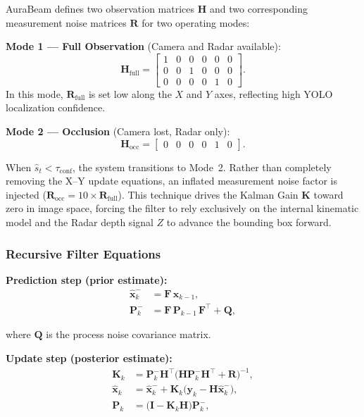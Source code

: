 \documentclass{jstarticle}
\theoremstyle{remark}
\begin{document}
AuraBeam defines two observation matrices $\mathbf{H}$ and two
corresponding measurement noise matrices $\mathbf{R}$ for two
operating modes:

\noindent\textbf{Mode 1 --- Full Observation} (Camera and Radar
available):
\begin{equation}
\mathbf{H}_{\mathrm{full}} =
\begin{bmatrix}
1 & 0 & 0 & 0 & 0 & 0 \\
0 & 0 & 1 & 0 & 0 & 0 \\
0 & 0 & 0 & 0 & 1 & 0
\end{bmatrix}.
\label{eq:H_full}
\end{equation}
In this mode, $\mathbf{R}_{\mathrm{full}}$ is set low along the $X$
and $Y$ axes, reflecting high YOLO localization confidence.

\noindent\textbf{Mode 2 --- Occlusion} (Camera lost, Radar only):
\begin{equation}
\mathbf{H}_{\mathrm{occ}} =
\begin{bmatrix}
0 & 0 & 0 & 0 & 1 & 0
\end{bmatrix}.
\label{eq:H_occ}
\end{equation}

When $\hat{s}_t < \tau_{\mathrm{conf}}$, the system transitions to
Mode~2. Rather than completely removing the X--Y update equations,
an inflated measurement noise factor is injected
($\mathbf{R}_{\mathrm{occ}} = 10 \times \mathbf{R}_{\mathrm{full}}$).
This technique drives the Kalman Gain $\mathbf{K}$ toward zero in
image space, forcing the filter to rely exclusively on the internal
kinematic model and the Radar depth signal $Z$ to advance the
bounding box forward.

\subsubsection{Recursive Filter Equations}

\noindent\textbf{Prediction step (prior estimate):}
\begin{align}
\hat{\mathbf{x}}^{-}_{k} &= \mathbf{F}\,\hat{\mathbf{x}}_{k-1},
\label{eq:kf_pred_x} \\
\mathbf{P}^{-}_{k} &= \mathbf{F}\,\mathbf{P}_{k-1}\,\mathbf{F}^{\top}
                    + \mathbf{Q},
\label{eq:kf_pred_p}
\end{align}

\noindent where $\mathbf{Q}$ is the process noise covariance matrix.

\noindent\textbf{Update step (posterior estimate):}
\begin{align}
\mathbf{K}_k &= \mathbf{P}^{-}_k \mathbf{H}^{\top}
               \bigl(\mathbf{H}\mathbf{P}^{-}_k\mathbf{H}^{\top}
               + \mathbf{R}\bigr)^{-1},
\label{eq:kf_gain} \\
\hat{\mathbf{x}}_k &= \hat{\mathbf{x}}^{-}_k
                   + \mathbf{K}_k\bigl(\mathbf{y}_k
                   - \mathbf{H}\hat{\mathbf{x}}^{-}_k\bigr),
\label{eq:kf_update_x} \\
\mathbf{P}_k &= \bigl(\mathbf{I} - \mathbf{K}_k\mathbf{H}\bigr)
               \mathbf{P}^{-}_k,
\label{eq:kf_update_p}
\end{align}
\end{document}
